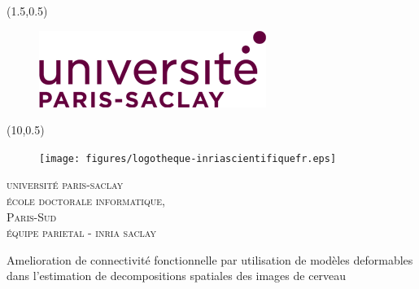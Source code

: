 \documentclass[nobib, a4paper, notoc, twoside, justified, openany]{tufte-book}
\begin{document}
\begin{titlepage}
\begin{fullwidth}
\begin{center}

\begin{textblock}{4}(1.5,0.5)
\begin{figure}
\includegraphics[width=\linewidth]{figures/unips_logo.png}
\end{figure}
\end{textblock}


\begin{textblock}{4.8}(10,0.5)
\begin{figure}
\texttt{[image: figures/logotheque-inriascientifiquefr.eps]}
\end{figure}
\end{textblock}



\vspace*{30pt}
\textsc{{\huge université paris-saclay} \\
 {\vspace{10pt} \LARGE école doctorale informatique, \\ Paris-Sud} \\
{\vspace{10pt}\LARGE équipe parietal - inria saclay}}


\vspace{10pt}



\vspace{2pc}
{ \Huge
{\color{msblue} {Amelioration de connectivit\'e fonctionnelle par utilisation de mod\`eles deformables dans l'estimation de decompositions spatiales des images de cerveau}} \\[0.5cm]
}



\end{center}
\end{fullwidth}
\end{titlepage}
\end{document}
